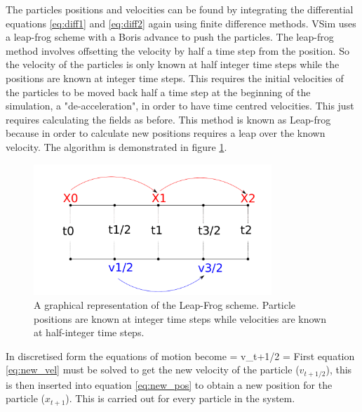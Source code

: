 
The particles positions and velocities can be found by integrating the differential equations \eqref{eq:diff1} and \eqref{eq:diff2} again using finite difference methods. VSim uses a leap-frog scheme with a Boris advance \cite{Boris} to push the particles. 
The leap-frog method involves offsetting the velocity by half a time step from the position. So the velocity of the particles is only known at half integer time steps while the positions are known at integer time steps. This requires the initial velocities of the particles to be moved back half a time step at the beginning of the simulation, a "de-acceleration", in order to have time centred velocities. This just requires calculating the fields as before. This method is known as Leap-frog because in order to calculate new positions requires a leap over the known velocity. The algorithm is demonstrated in figure \ref{fig:Leap-frog}.

\begin{figure}[H]
\centering
\includegraphics[width=0.8\textwidth]{leap_frog.pdf}
\caption{A graphical representation of the Leap-Frog scheme. Particle positions are known at integer time steps while velocities are known at half-integer time steps.}
\label{fig:Leap-frog}
\end{figure}
In discretised form the equations of motion become
\be 
{} = v_{t+1/2}
\label{eq:new_pos}
\ee
\be
{} = 
\label{eq:new_vel}
\ee 
First equation \ref{eq:new_vel} must be solved to get the new velocity of the particle ($v_{t+1/2}$), this is then inserted into equation \ref{eq:new_pos} to obtain a new position for the particle ($x_{t+1}$). This is carried out for every particle in the system. 


